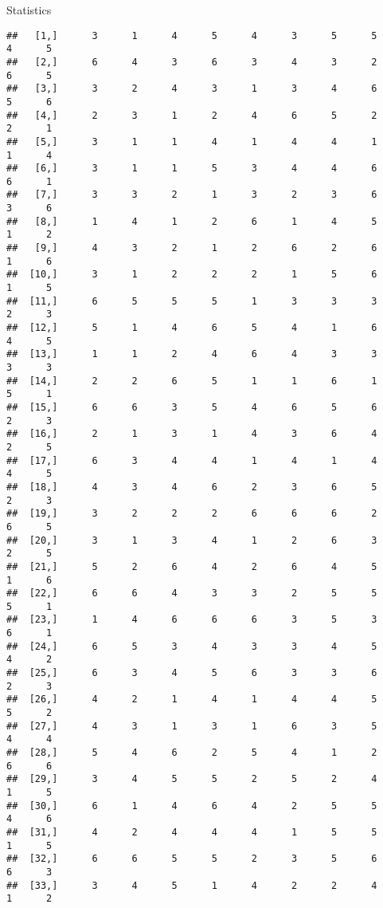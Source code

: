 \documentclass[
  ignorenonframetext,
]{beamer}
\begin{document}
\begin{frame}[fragile]{Statistics}
\begin{verbatim}
##   [1,]      3      1      4      5      4      3      5      5      4      5
##   [2,]      6      4      3      6      3      4      3      2      6      5
##   [3,]      3      2      4      3      1      3      4      6      5      6
##   [4,]      2      3      1      2      4      6      5      2      2      1
##   [5,]      3      1      1      4      1      4      4      1      1      4
##   [6,]      3      1      1      5      3      4      4      6      6      1
##   [7,]      3      3      2      1      3      2      3      6      3      6
##   [8,]      1      4      1      2      6      1      4      5      1      2
##   [9,]      4      3      2      1      2      6      2      6      1      6
##  [10,]      3      1      2      2      2      1      5      6      1      5
##  [11,]      6      5      5      5      1      3      3      3      2      3
##  [12,]      5      1      4      6      5      4      1      6      4      5
##  [13,]      1      1      2      4      6      4      3      3      3      3
##  [14,]      2      2      6      5      1      1      6      1      5      1
##  [15,]      6      6      3      5      4      6      5      6      2      3
##  [16,]      2      1      3      1      4      3      6      4      2      5
##  [17,]      6      3      4      4      1      4      1      4      4      5
##  [18,]      4      3      4      6      2      3      6      5      2      3
##  [19,]      3      2      2      2      6      6      6      2      6      5
##  [20,]      3      1      3      4      1      2      6      3      2      5
##  [21,]      5      2      6      4      2      6      4      5      1      6
##  [22,]      6      6      4      3      3      2      5      5      5      1
##  [23,]      1      4      6      6      6      3      5      3      6      1
##  [24,]      6      5      3      4      3      3      4      5      4      2
##  [25,]      6      3      4      5      6      3      3      6      2      3
##  [26,]      4      2      1      4      1      4      4      5      5      2
##  [27,]      4      3      1      3      1      6      3      5      4      4
##  [28,]      5      4      6      2      5      4      1      2      6      6
##  [29,]      3      4      5      5      2      5      2      4      1      5
##  [30,]      6      1      4      6      4      2      5      5      4      6
##  [31,]      4      2      4      4      4      1      5      5      1      5
##  [32,]      6      6      5      5      2      3      5      6      6      3
##  [33,]      3      4      5      1      4      2      2      4      1      2

\end{verbatim}
\end{frame}
\end{document}
